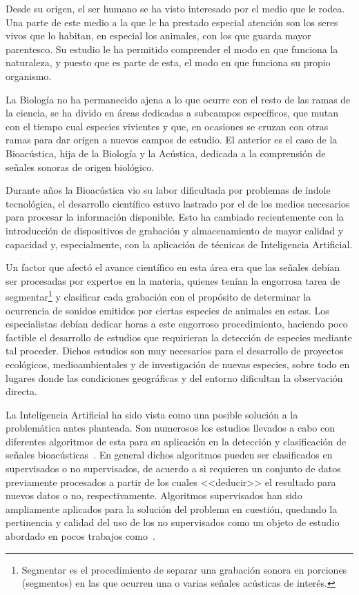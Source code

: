 
Desde su origen, el ser humano se ha visto interesado por el medio que le rodea.
Una parte de este medio a la que le ha prestado especial atención son los seres vivos que lo habitan, en especial los animales, con los que guarda mayor parentesco.
Su estudio le ha permitido comprender el modo en que funciona la naturaleza, y puesto que es parte de esta, el modo en que funciona su propio organismo.

La Biología no ha permanecido ajena a lo que ocurre con el resto de las ramas de la ciencia, se ha divido en áreas dedicadas a subcampos específicos, que mutan con el tiempo cual especies vivientes y que, en ocasiones se cruzan con otras ramas para dar origen a nuevos campos de estudio.
El anterior es el caso de la Bioacústica, hija de la Biología y la Acústica, dedicada a la comprensión de señales sonoras de origen biológico.

Durante años la Bioacústica vio su labor dificultada por problemas de índole tecnológica, el desarrollo científico estuvo lastrado por el de los medios necesarios para procesar la información disponible.
Esto ha cambiado recientemente con la introducción de dispositivos de grabación y almacenamiento de mayor calidad y capacidad y, especialmente, con la aplicación de técnicas de Inteligencia Artificial.

Un factor que afectó el avance científico en esta área era que las señales debían ser procesadas por expertos en la materia, quienes tenían la engorrosa tarea de segmentar\footnote{Segmentar es el procedimiento de separar una grabación sonora en porciones (segmentos) en las que ocurren una o varias señales acústicas de interés.} y clasificar cada grabación con el propósito de determinar la ocurrencia de sonidos emitidos por ciertas especies de animales en estas.
Los especialistas debían dedicar horas a este engorroso procedimiento, haciendo poco factible el desarrollo de estudios que requirieran la detección de especies mediante tal proceder.
Dichos estudios son muy necesarios para el desarrollo de proyectos ecológicos, medioambientales y de investigación de nuevas especies, sobre todo en lugares donde las condiciones geográficas y del entorno dificultan la observación directa.

La Inteligencia Artificial ha sido vista como una posible solución a la problemática antes planteada.
Son numerosos los estudios llevados a cabo con diferentes algoritmos de esta para su aplicación en la detección y clasificación de señales bioacústicas~\cite{Gerhard03}.
En general dichos algoritmos pueden ser clasificados en supervisados o no supervisados, de acuerdo a si requieren un conjunto de datos previamente procesados a partir de los cuales <<deducir>> el resultado para nuevos datos o no, respectivamente.
Algoritmos supervisados han sido ampliamente aplicados para la solución del problema en cuestión, quedando la pertinencia y calidad del uso de los no supervisados como un objeto de estudio abordado en pocos trabajos como~\cite{Jancovic13}.

